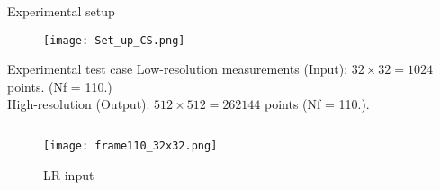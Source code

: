 \documentclass[10pt,aspectratio=169,dvipsnames]{beamer} %
\begin{document}
			\begin{frame}{Experimental setup}
				\begin{figure}
					\centering
					\texttt{[image: Set\_up\_CS.png]}
				\end{figure}
			\end{frame}
	\setcounter{subfigure}{0}
	\begin{frame}{Experimental test case}
		Low-resolution measurements (Input): \(32\times32=1024\) points. (Nf = 110.)\\
		High-resolution (Output): \(512\times512=262144\) points (Nf = 110.).
		\begin{columns}[T]
			\begin{column}[c]{0.19\textwidth}
				\begin{figure}						
					\texttt{[image: frame110\_32x32.png]}
					\caption{LR input}
				\end{figure}
			\end{column}
			\begin{column}[c]{0.8\textwidth}
				\begin{figure}[ht!]
					\quad
					\quad
					\quad
					\quad
					\quad
					
					\quad
					\quad
					\quad
					\quad
					\quad
				\end{figure}
			\end{column}				
		\end{columns}
	\end{frame}
\end{document}
